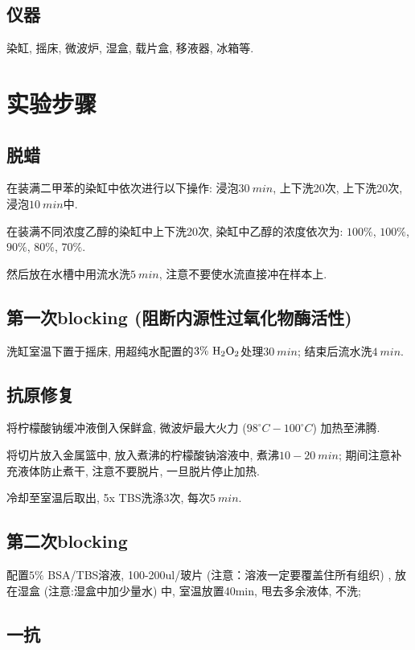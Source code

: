 \documentclass{article}
\begin{document}
\subsection{仪器}

染缸, 摇床, 微波炉, 湿盒, 载片盒, 移液器, 冰箱等.

\section{实验步骤}

\subsection{脱蜡}

在装满二甲苯的染缸中依次进行以下操作: 浸泡$30\ min$, 上下洗20次, 上下洗20次, 浸泡$10\ min$中.

在装满不同浓度乙醇的染缸中上下洗20次, 染缸中乙醇的浓度依次为: $100\%$, $100\%$, $90\%$, $80\%$, $70\%$.

然后放在水槽中用流水洗$5\ min$, 注意不要使水流直接冲在样本上.

\subsection{第一次blocking (阻断内源性过氧化物酶活性)}

洗缸室温下置于摇床, 用超纯水配置的$3\% \ \ce{H2O2}$处理$30\ min$; 结束后流水洗$4\ min$. 

\subsection{抗原修复}

将柠檬酸钠缓冲液倒入保鲜盒, 微波炉最大火力 ($98^{\circ} C-100^{\circ} C$) 加热至沸腾. 

将切片放入金属篮中, 放入煮沸的柠檬酸钠溶液中, 煮沸$10-20\ min$; 期间注意补充液体防止煮干, 注意不要脱片, 一旦脱片停止加热.

冷却至室温后取出, 5x TBS洗涤3次, 每次$5\ min$.

\subsection{第二次blocking}

配置$5\%$ BSA/TBS溶液, 100-200ul/玻片 (注意：溶液一定要覆盖住所有组织) , 放在湿盒 (注意:湿盒中加少量水) 中, 室温放置40min, 甩去多余液体, 不洗; 

\subsection{一抗}
\end{document}
